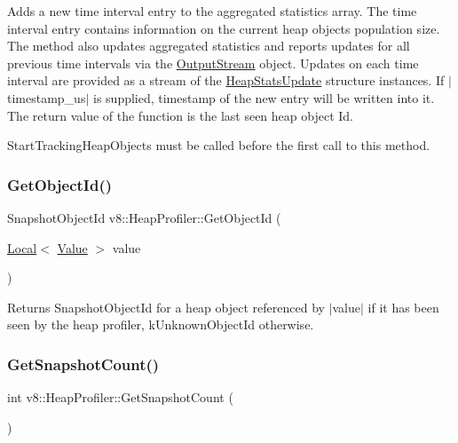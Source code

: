 Adds a new time interval entry to the aggregated statistics array. The time interval entry contains information on the current heap objects population size. The method also updates aggregated statistics and reports updates for all previous time intervals via the \mbox{\hyperlink{classv8_1_1OutputStream}{Output\+Stream}} object. Updates on each time interval are provided as a stream of the \mbox{\hyperlink{structv8_1_1HeapStatsUpdate}{Heap\+Stats\+Update}} structure instances. If $\vert$timestamp\+\_\+us$\vert$ is supplied, timestamp of the new entry will be written into it. The return value of the function is the last seen heap object Id.

Start\+Tracking\+Heap\+Objects must be called before the first call to this method. \mbox{\label{classv8_1_1HeapProfiler_ab926a1f1ed95b731d4ef3133e67eef19}} 
\subsubsection{\texorpdfstring{Get\+Object\+Id()}{GetObjectId()}}
{\footnotesize\ttfamily Snapshot\+Object\+Id v8\+::\+Heap\+Profiler\+::\+Get\+Object\+Id (\begin{DoxyParamCaption}\item[{\mbox{\hyperlink{classv8_1_1Local}{Local}}$<$ \mbox{\hyperlink{classv8_1_1Value}{Value}} $>$}]{value }\end{DoxyParamCaption})}

Returns Snapshot\+Object\+Id for a heap object referenced by $\vert$value$\vert$ if it has been seen by the heap profiler, k\+Unknown\+Object\+Id otherwise. \mbox{\label{classv8_1_1HeapProfiler_a24830775a0ab938eb0a29ed8f3dfd265}} 
\subsubsection{\texorpdfstring{Get\+Snapshot\+Count()}{GetSnapshotCount()}}
{\footnotesize\ttfamily int v8\+::\+Heap\+Profiler\+::\+Get\+Snapshot\+Count (\begin{DoxyParamCaption}{ }\end{DoxyParamCaption})}

